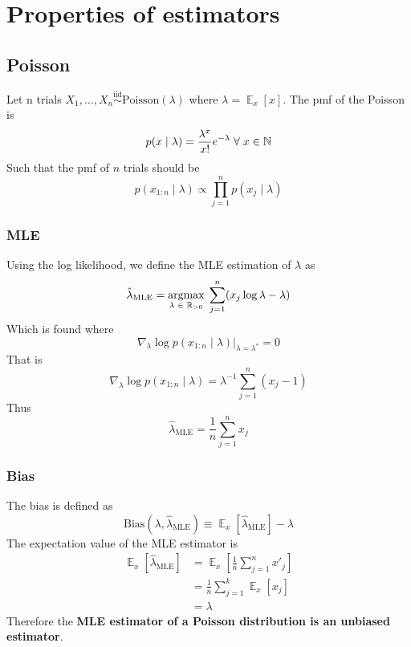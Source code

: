 \documentclass{article}
\DeclareMathOperator{\E}{\mathbb{E}}
\newcommand{\s}{\hspace{0.1cm}}
\numberwithin{equation}{section}
\newcommand{\mle}[1]{\hat{#1}_{\text{MLE}}}
\begin{document}
 \section{Properties of estimators}
 \subsection{Poisson}
 Let n trials $X_1,\dots,X_n \overset{\text{iid}}{\sim} \text{Poisson}(\lambda) $ where 
 $\lambda = \E_x[x]$. The 
 pmf of the Poisson is
 \[
         p(x \mid \lambda) = \frac{\lambda^x}{x!} e^{-\lambda}\s \forall \s x \in \mathbb{N}
 \]
 Such that the pmf of $n$ trials should be
  \[
         p(x_{1:n} \mid \lambda) \propto \prod_{j = 1}^n p(x_j \mid \lambda)
 \]
 \subsubsection{MLE}
Using the log likelihood, we define the MLE estimation of $\lambda$ as
 \[
         \hat{\lambda}_{\text{MLE}} = 
                 \underset{\lambda \s \in \s \mathbb{R}_{>0}}{\text{argmax} } 
                \s
        \sum_{j = 1}^n
        (x_j \log \lambda - \lambda)
\]
Which is found where
\[
        \nabla_\lambda \log p(x_{1:n} \mid \lambda ) \bigg|_{\lambda = \lambda^*} = 0
\]
That is
\[
        \nabla_\lambda \log p(x_{1:n} \mid \lambda) = \lambda^{-1} \sum_{j = 1}^n(x_j - 1)
\]
Thus
\[
        \boxed{\hat{\lambda}_{\text{MLE}} = \frac{1}{n}\sum_{j = 1}^n x_j  }
\]


\subsubsection{Bias}
The bias is defined as 
\[
        \text{Bias}(\lambda, \mle{\lambda}) \equiv \E_x[\mle{\lambda}] - \lambda
\]
The expectation value of the MLE estimator is
\begin{align*}
        \E_x[\mle{\lambda}] &= \E_x \left[    \frac{1}{n}\sum_{j=1}^n x'_j \right] \\
                             &= \frac{1}{n} \sum_{j = 1}^k \E_x[x_j] \\
                             &= \lambda
\end{align*} 
Therefore the \textbf{MLE estimator of a Poisson distribution is an unbiased estimator}.
\end{document}
